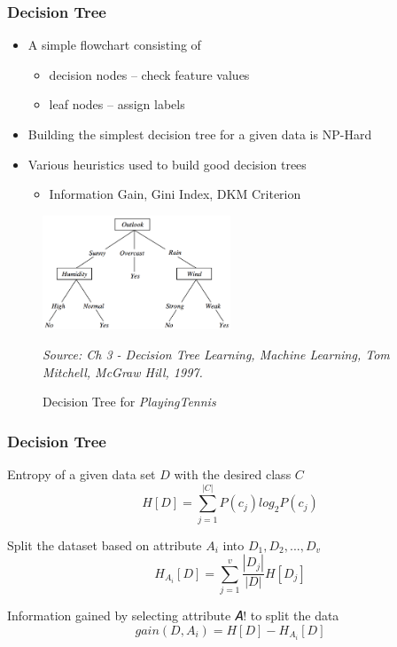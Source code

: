 \documentclass{beamer}
\begin{document}
\begin{frame}
\frametitle{Decision Tree}
\begin{itemize}
\item A simple flowchart consisting of
	\begin{itemize}
	\item decision nodes -- check feature values
	\item leaf nodes -- assign labels
	\end{itemize}
\item Building the simplest decision tree for a given data is NP-Hard
\item Various heuristics used to build good decision trees
	\begin{itemize}
	\item Information Gain, Gini Index, DKM Criterion
	\end{itemize}
\end{itemize}

\begin{figure}[h]
\centering
\includegraphics[width=0.5\textwidth]{img/DTree.png}
\caption{Decision Tree for \textit{PlayingTennis}}
\tiny{\textit{Source: Ch 3 - Decision Tree Learning, Machine Learning, Tom Mitchell, McGraw Hill, 1997.}}
\label{fig:DT}
\end{figure}

\end{frame}

\begin{frame}
\frametitle{Decision Tree}

Entropy of a given data set $D$ with the desired class $C$
\begin{equation}
H[D]	= \sum_{j=1}^{|C|} P(c_j)log_2 P(c_j)
\end{equation}

Split the dataset based on attribute $A_i$ into $D_1, D_2, ..., D_v$
\begin{equation}
H_{A_i}[D]	= \sum_{j=1}^{v} \frac{|D_j|}{|D|} H[D_j]
\end{equation}

Information gained by selecting attribute 𝐴! to split the data
\begin{equation}
gain(D,A_i) = H[D] - H_{A_i}[D]
\end{equation}

\end{frame}
\end{document}
